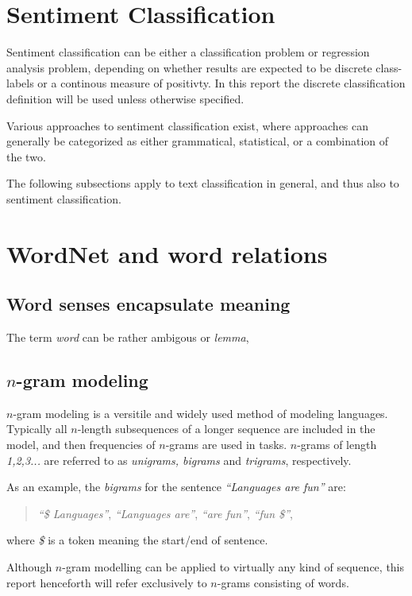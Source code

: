 \documentclass[a4paper,11pt]{kth-mag}
\newcommand{\ngram}{$n$-gram }
\newcommand{\ngrams}{$n$-grams }
\begin{document}
\section{Sentiment Classification}
Sentiment classification can be either a classification problem or regression analysis problem\cite{liu2012sentiment}, depending on whether results are expected to be discrete class-labels or a continous measure of positivty. In this report the discrete classification definition will be used unless otherwise specified.

Various approaches to sentiment classification exist, where approaches can generally be categorized as either grammatical\cite{todo}, statistical\cite{todo}, or a combination of the two.

The following subsections apply to text classification in general, and thus also to sentiment classification.

\section{WordNet and word relations}
\subsection{Word senses encapsulate meaning}
The term \emph{word} can be rather ambigous or \emph{lemma}, 


\subsection{\ngram modeling}
\ngram modeling is a versitile and widely used method of modeling languages. Typically all $n$-length subsequences of a longer sequence are included in the model, and then frequencies of \ngrams are used in tasks. $n$-grams of length \emph{1,2,3...} are referred to as \emph{unigrams, bigrams} and \emph{trigrams}, respectively.

As an example, the \emph{bigrams} for the sentence \emph{``Languages are fun''} are:
\begin{quote}
  \vspace*{0.1cm}
  \centering
\emph{``\$ Languages''}, \emph{``Languages are''}, \emph{``are fun''}, \emph{``fun \$''},
\end{quote}
where \emph{\$} is a token meaning the start/end of sentence.

Although \ngram modelling can be applied to virtually any kind of sequence, this report henceforth will refer exclusively to \ngrams consisting of words.
\end{document}
